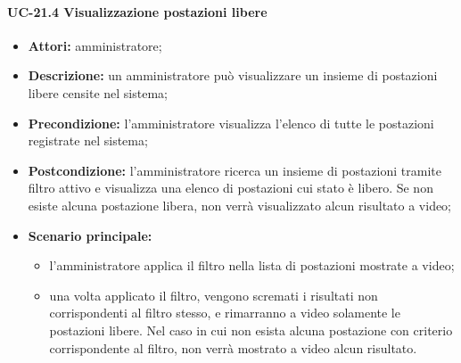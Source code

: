 \paragraph{UC-21.4 Visualizzazione postazioni libere}
\begin{itemize}
    \item \textbf{Attori:} amministratore;
    \item \textbf{Descrizione:} un amministratore pu\`{o} visualizzare un insieme di postazioni libere censite nel sistema;
    \item \textbf{Precondizione:} l'amministratore visualizza l'elenco di tutte le postazioni registrate nel sistema;
    \item \textbf{Postcondizione:} l'amministratore ricerca un insieme di postazioni tramite filtro attivo e visualizza una elenco di postazioni cui stato è libero. Se non esiste alcuna postazione libera, non verrà visualizzato alcun risultato a video;
    \item \textbf{Scenario principale:}
    \begin{itemize}
        \item l'amministratore applica il filtro nella lista di postazioni mostrate a video;
        \item una volta applicato il filtro, vengono scremati i risultati non corrispondenti al filtro stesso, e rimarranno a video solamente le postazioni libere. Nel caso in cui non esista alcuna postazione con criterio corrispondente al filtro, non verrà mostrato a video alcun risultato.
    \end{itemize}
\end{itemize}

